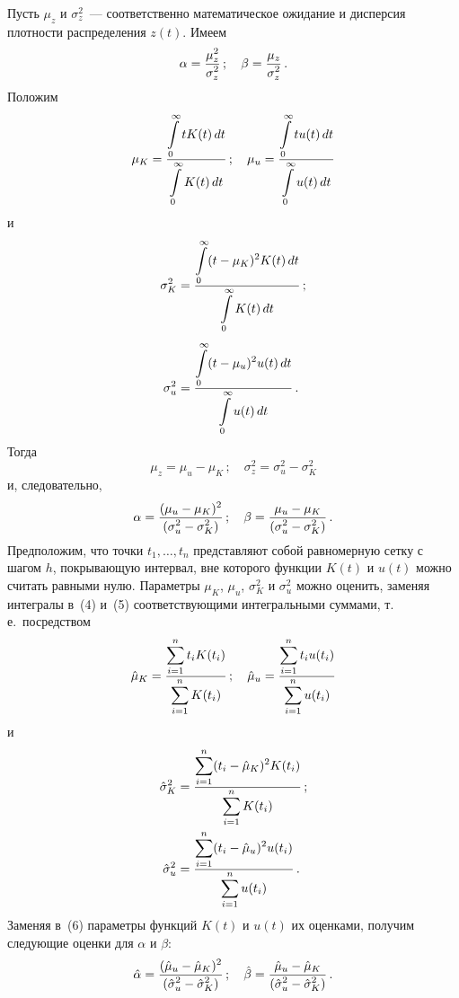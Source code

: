 \begin{multicols}{2}
Пусть $\mu_z$ и $\sigma_z^2$~--- соответственно математическое
ожидание и дисперсия плотности распределения $z(t)$. Имеем
$$
\alpha=\displaystyle\frac{\displaystyle \mu_z^2\mathstrut}{\displaystyle \sigma_z^2\mathstrut}\,;\quad
\beta=\displaystyle\frac{\displaystyle \mu_z\mathstrut}{\displaystyle \sigma_z^2\mathstrut}\,.
$$ 
Положим
\begin{equation} %
\mu_K=\fr{\int\limits_0^\infty tK(t)\,dt}{\int\limits_0^\infty K(t)\,dt}\,;\quad %
\mu_u=\fr{\int\limits_0^\infty tu(t)\,dt}{\int\limits_0^\infty
u(t)\,dt} %
\end{equation} %
и
\begin{align}
\sigma_K^2&=\displaystyle\frac{\displaystyle \int\limits_0^\infty(t-\mu_K)^2K(t)\,dt\mathstrut}{\displaystyle \int\limits_0^\infty
K(t)\,dt\mathstrut}\,;\notag\\[-6pt]
&\label{5us}\\[-6pt]
\sigma_u^2&=\displaystyle\frac{\displaystyle \int\limits_0^\infty(t-\mu_u)^2u(t)\,dt\mathstrut}{\displaystyle \int\limits_0^\infty
u(t)\,dt\mathstrut}\,.\notag
\end{align} 
Тогда 
$$
\mu_z=\mu_u-\mu_K\,;\quad 
\sigma_z^2=\sigma_u^2-\sigma_K^2
$$ 
и, следовательно,
\begin{equation} %
\alpha=\fr{(\mu_u-\mu_K)^2}{(\sigma_u^2-\sigma_K^2)}\,;\quad %
\beta=\fr{\mu_u-\mu_K}{(\sigma_u^2-\sigma_K^2)}\,.
\end{equation} %
Предположим, что точки $t_1,\ldots ,t_n$ представляют собой
равномерную сетку с шагом $h$, по\-кры\-ва\-ющую интервал, вне которого
функции $K(t)$ и $u(t)$ можно считать равными нулю. Параметры
$\mu_K$, $\mu_u$, $\sigma_K^2$ и $\sigma_u^2$ можно оценить,
заменяя интегралы в~(4) и~(5) соответствующими интегральными
суммами, т.\,е.\ посредством
\begin{equation*} %
\hat\mu_K=\fr{\sum_{i=1}^nt_iK(t_i)}{\sum_{i=1}^nK(t_i)}\,;\quad
\hat\mu_u=\fr{\sum_{i=1}^nt_iu(t_i)}{\sum_{i=1}^nu(t_i)}
\end{equation*} %
и
\begin{align*}
\hat\sigma_K^2&=\displaystyle\frac{\displaystyle \sum_{i=1}^n(t_i-\hat\mu_K)^2K(t_i)\mathstrut}{\displaystyle \sum_{i=1}^nK(t_i)\mathstrut}\,;\\
\hat\sigma_u^2&=\displaystyle\frac{\displaystyle \sum_{i=1}^n(t_i-\hat\mu_u)^2u(t_i)\mathstrut}{\displaystyle \sum_{i=1}^nu(t_i)\mathstrut}\,.
\end{align*}
Заменяя в~(6) параметры функций $K(t)$ и $u(t)$ их оценками,
получим следующие оценки для $\alpha$ и $\beta$:
\begin{equation*} %
\hat\alpha =\fr{(\hat\mu_u-\hat\mu_K)^2}{(\hat\sigma_u^2-\hat\sigma_K^2)}\,;\quad
\hat\beta =\fr{\hat\mu_u-\hat\mu_K}{(\hat\sigma_u^2-\hat\sigma_K^2)}\,.
\end{equation*} %


\end{multicols}
